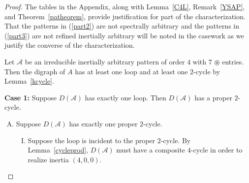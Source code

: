 \documentclass[10pt]{amsart}
\begin{document}
\begin{proof}  The tables in the Appendix, along with Lemma~\ref{C4L}, Remark~\ref{YSAP}, and Theorem~\ref{patheorem}, 
provide justification for part of the characterization. That the patterns in (\ref{part2}) are not spectrally arbitrary
and the patterns in (\ref{part3}) are not refined inertially arbitrary will be noted in the casework 
as we justify the converse of the characterization. 

Let ${\mathcal{A}}$ be an irreducible inertially arbitrary pattern of order $4$ with $7$ ${\circledast}$ entries.
Then the digraph of $A$ has at least one loop and at least one $2$-cycle by Lemma~\ref{kcycle}. 
 
	\textbf{Case 1:} Suppose $D({\mathcal{A}})$ has exactly one loop. Then $D({\mathcal{A}})$ has a proper $2$-cycle.
	\begin{enumerate}[(A)]
		\item Suppose $D({\mathcal{A}})$ has exactly one proper $2$-cycle. 
		\begin{enumerate}[(I)]
			\item Suppose the loop is incident to the proper $2$-cycle. By Lemma~\ref{cycleprod}, $D({\mathcal{A}})$ must
			have a composite $4$-cycle in order to realize inertia $(4,0,0)$.
			\begin{enumerate}[(a)]
				

\end{enumerate}
\end{enumerate}
\end{enumerate}
\end{proof}
\end{document}
